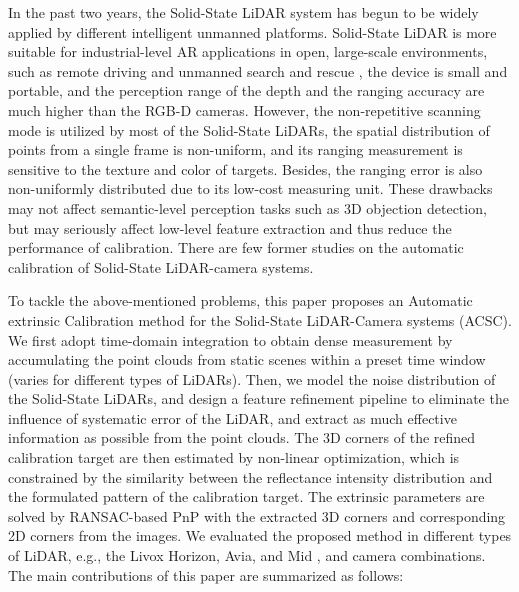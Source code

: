 \documentclass[journal]{vgtc}
\begin{document}
In the past two years, the Solid-State LiDAR system has begun to be widely applied by different intelligent unmanned platforms\cite{lin2020loam,liu2020balm, lin2019fast}. Solid-State LiDAR is more suitable for industrial-level AR applications in open, large-scale environments, such as remote driving \cite{merenda2019effects} and unmanned search and rescue \cite{demirkan2020evaluation}, the device is small and portable, and the perception range of the depth and the ranging accuracy are much higher than the RGB-D cameras. However, the non-repetitive scanning mode is utilized by most of the Solid-State LiDARs, the spatial distribution of points from a single frame is non-uniform, and its ranging measurement is sensitive to the texture and color of targets. Besides, the ranging error is also non-uniformly distributed due to its low-cost measuring unit. These drawbacks may not affect semantic-level perception tasks such as 3D objection detection, but may seriously affect low-level feature extraction and thus reduce the performance of calibration. There are few former studies on the automatic calibration of Solid-State LiDAR-camera systems.



To tackle the above-mentioned problems, this paper proposes an Automatic extrinsic Calibration method for the Solid-State LiDAR-Camera systems (ACSC). We first adopt time-domain integration to obtain dense measurement by accumulating the point clouds from static scenes within a preset time window (varies for different types of LiDARs). Then, we model the noise distribution of the Solid-State LiDARs, and design a feature refinement pipeline to eliminate the influence of systematic error of the LiDAR, and extract as much effective information as possible from the point clouds. The 3D corners of the refined calibration target are then estimated by non-linear optimization, which is constrained by the similarity between the reflectance intensity distribution and the formulated pattern of the calibration target. The extrinsic parameters are solved by RANSAC-based PnP with the extracted 3D corners and corresponding 2D corners from the images. We evaluated the proposed method in different types of LiDAR, e.g., the Livox Horizon, Avia, and Mid , and camera combinations. The main contributions of this paper are summarized as follows:
\end{document}
